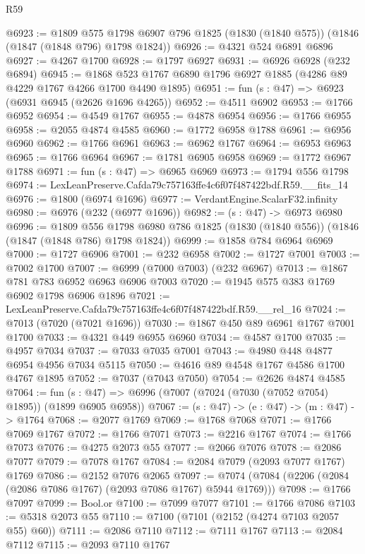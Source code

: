 \begin{lexlean}{R59}
\begin{coremodule}
@6923 := @1809
    @575
    @1798
    @6907
    @796
    @1825
    (@1830 (@1840 @575))
    (@1846 (@1847 (@1848 @796) @1798 @1824))
@6926 := @4321 @524 @6891 @6896
@6927 := @4267 @1700
@6928 := @1797 @6927
@6931 := @6926 @6928 (@232 @6894)
@6945 := @1868 @523 @1767 @6890 @1796 @6927 @1885 (@4286 @89 @4229 @1767 @4266 @1700 @4490 @1895)
@6951 := fun (s : @47) => @6923 (@6931 @6945 (@2626 @1696 @4265))
@6952 := @4511 @6902
@6953 := @1766 @6952
@6954 := @4549 @1767
@6955 := @4878 @6954
@6956 := @1766 @6955
@6958 := @2055 @4874 @4585
@6960 := @1772 @6958 @1788
@6961 := @6956 @6960
@6962 := @1766 @6961
@6963 := @6962 @1767
@6964 := @6953 @6963
@6965 := @1766 @6964
@6967 := @1781 @6905 @6958
@6969 := @1772 @6967 @1788
@6971 := fun (s : @47) => @6965 @6969
@6973 := @1794 @556 @1798
@6974 := LexLeanPreserve.Cafda79c757163ffe4c6f07f487422bdf.R59.__fits_14
@6976 := @1800 (@6974 @1696)
@6977 := VerdantEngine.ScalarF32.infinity
@6980 := @6976 (@232 (@6977 @1696))
@6982 := (s : @47) -> @6973 @6980
@6996 := @1809
    @556
    @1798
    @6980
    @786
    @1825
    (@1830 (@1840 @556))
    (@1846 (@1847 (@1848 @786) @1798 @1824))
@6999 := @1858 @784 @6964 @6969
@7000 := @1727 @6906
@7001 := @232 @6958
@7002 := @1727 @7001
@7003 := @7002 @1700
@7007 := @6999 (@7000 @7003) (@232 @6967)
@7013 := @1867 @781 @783 @6952 @6963 @6906 @7003
@7020 := @1945 @575 @383 @1769 @6902 @1798 @6906 @1896
@7021 := LexLeanPreserve.Cafda79c757163ffe4c6f07f487422bdf.R59.__rel_16
@7024 := @7013 (@7020 (@7021 @1696))
@7030 := @1867 @450 @89 @6961 @1767 @7001 @1700
@7033 := @4321 @449 @6955 @6960
@7034 := @4587 @1700
@7035 := @4957 @7034
@7037 := @7033 @7035 @7001
@7043 := @4980 @448 @4877 @6954 @4956 @7034 @5115
@7050 := @4616 @89 @4548 @1767 @4586 @1700 @4767 @1895
@7052 := @7037 (@7043 @7050)
@7054 := @2626 @4874 @4585
@7064 := fun (s : @47) => @6996 (@7007 (@7024 (@7030 (@7052 @7054) @1895)) (@1899 @6905 @6958))
@7067 := (s : @47) -> (e : @47) -> (m : @47) -> @1764
@7068 := @2077 @1769
@7069 := @1768 @7068
@7071 := @1766 @7069 @1767
@7072 := @1766 @7071
@7073 := @2216 @1767
@7074 := @1766 @7073
@7076 := @4275 @2073 @55
@7077 := @2066 @7076
@7078 := @2086 @7077
@7079 := @7078 @1767
@7084 := @2084 @7079 (@2093 @7077 @1767) @1769
@7086 := @2152 @7076 @2065
@7097 := @7074 (@7084 (@2206 (@2084 (@2086 @7086 @1767) (@2093 @7086 @1767) @5944 @1769)))
@7098 := @1766 @7097
@7099 := Bool.or
@7100 := @7099 @7077
@7101 := @1766 @7086
@7103 := @5318 @2073 @55
@7110 := @7100 (@7101 (@2152 (@4274 @7103 @2057 @55) @60))
@7111 := @2086 @7110
@7112 := @7111 @1767
@7113 := @2084 @7112
@7115 := @2093 @7110 @1767

\end{coremodule}
\end{lexlean}

